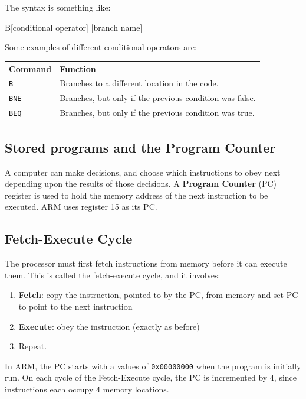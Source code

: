 \documentclass{article}
\begin{document}
The syntax is something like:

\begin{listing}{1}
	B[conditional operator]	[branch name]
\end{listing}

Some examples of different conditional operators are:

\begin{tabularx}{\textwidth}{l X}
	{\bf Command} & {\bf Function}\\
	\texttt{B} & Branches to a different location in the code.\\
	\texttt{BNE} & Branches, but only if the previous condition was false.\\
	\texttt{BEQ} & Branches, but only if the previous condition was true.\\
\end{tabularx}

\subsection{Stored programs and the Program Counter}
\label{subsec:pc}

A computer can make decisions, and choose which instructions to obey next depending upon the results of those decisions. A {\bf Program Counter} (PC) register is used to hold the memory address of the next instruction to be executed. ARM uses register 15 as its PC.

\subsection{Fetch-Execute Cycle}

The processor must first fetch instructions from memory before it can execute them. This is called the fetch-execute cycle, and it involves:

\begin{enumerate}
	\item \textbf{Fetch}: copy the instruction, pointed to by the PC, from memory and set PC to point to the next instruction
	\item \textbf{Execute}:  obey the instruction (exactly as before)
	\item Repeat.
\end{enumerate}

In ARM, the PC starts with a values of \texttt{0x00000000} when the program is initially run. On each cycle of the Fetch-Execute cycle, the PC is incremented by 4, since instructions each occupy 4 memory locations.
\end{document}
